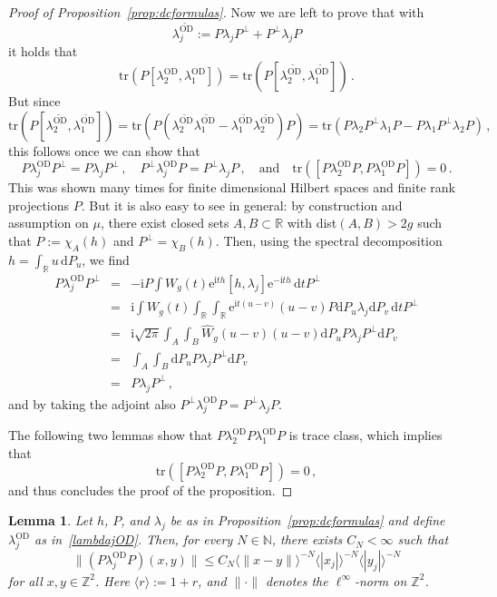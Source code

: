 \documentclass[a4paper]{article}
\newcommand{\tr}{\mathrm{tr}}
\newcommand{\e}{\mathrm{e}}
\renewcommand{\i}{\mathrm{i}}
\newcommand{\N}{\mathbb{N}}
\newcommand{\Z}{\mathbb{Z}}
\newcommand{\R}{\mathbb{R}}
\newcommand{\OD}[1][]{   ^{\mathrm{OD}#1}   }
\newcommand{\ODT}[1][]{   ^{\widetilde{\mathrm{OD}}#1}   }
\newcommand{\dd}{\mathrm{d}}
\theoremstyle{plain}
\newtheorem{lemma}[theorem]{Lemma}
\theoremstyle{definition}
\theoremstyle{remark}
\renewcommand{\(}{\left(}
\renewcommand{\)}{\right)}
\begin{document}
\begin{proof}[Proof of  Proposition~\ref{prop:dcformulas}]
Now we are left to prove that with
\[
\lambda_j^{\widetilde{\mathrm{OD}}} := P\lambda_jP^\perp + P^\perp \lambda_jP
\]
it holds that 
\[
\tr(P [\lambda_2\OD,\lambda_1\OD])
=\tr(P [\lambda_2\ODT ,\lambda_1\ODT])\,.
\]
But 
since 
\[
\tr(P [\lambda_2\ODT ,\lambda_1\ODT])= \tr(P (\lambda_2\ODT \lambda_1\ODT - \lambda_1\ODT \lambda_2\ODT) P) = \tr(P \lambda_2 P^\perp \lambda_1 P - P \lambda_1 P^\perp \lambda_2 P) \,,
\]
this follows once we can show that
\[
P\lambda_j\OD P^\perp = P\lambda_j P^\perp\,,\quad  P^\perp \lambda_j\OD P= P^\perp\lambda_j P\,,\quad\mbox{and}\quad \tr([P\lambda_2\OD P,P\lambda_1\OD P])= 0 \,.
\]
This was shown  many times for finite dimensional Hilbert spaces and finite rank projections $P$. But it is also easy to see in general: by construction and assumption on $\mu$, there exist closed sets $A,B\subset \R$ with dist$(A,B)>2g$ such that $P:= \chi_A(h)$ and $P^\perp=\chi_B(h)$.
Then,  using the spectral decomposition $h= \int_{\R} u\,\dd P_u $, we find
\begin{eqnarray*}
    P\lambda_j\OD P^\perp  &=& -\i P\int W_g(t) \e^{\i th}[h,\lambda_j] \e^{-\i th}\,\mathrm{d}t P^\perp \\
    &=&\i
    \int W_g(t) \int_\R  \int_\R \e^{\i t(u-v)}(u-v) P\dd P_u \lambda_j \dd P_v\,\mathrm{d}t P^\perp 
    \\
    &=&\i\sqrt{2\pi}
     \int_A  \int_B  \hat W_g(u-v)(u-v) \dd P_u P\lambda_j  P^\perp\dd P_v
     \\
     &=&
    \int_A  \int_B  \dd P_u P\lambda_j  P^\perp\dd P_v
     \\
     &=&    P\lambda_jP^\perp \,,
\end{eqnarray*}
and by taking the adjoint also 
$P^\perp\lambda_j\OD P =P^\perp\lambda_jP $. 

The following two lemmas  show that $P\lambda_2\OD P\lambda_1\OD P$ is trace class, which implies   that
\[
\tr([P\lambda_2\OD P,P\lambda_1\OD P])= 0 \,,
\]
and thus concludes the proof of the proposition.
\end{proof}

\begin{lemma}\label{lem:diagonal-block-strip-local}
Let $h$, $P$, and $\lambda_j$ be as in Proposition~\ref{prop:dcformulas}
and define  $\lambda_j\OD$ as in~\eqref{lambdajOD}. 
Then, for every $N\in\N$, there exists $C_N<\infty$ such that
\[
    \bigl\|(P\lambda_j\OD P)(x,y)\bigr\|
    \le
    C_N
    \langle \|x-y\|\rangle^{-N}
    \langle |x_j|\rangle^{-N}
    \langle |y_j|\rangle^{-N}
\]
for all $x,y\in\Z^2$. Here $\langle r\rangle := 1+r$, and
$\|\cdot\|$ denotes the $\ell^\infty$-norm on $\Z^2$.
\end{lemma}
\end{document}

